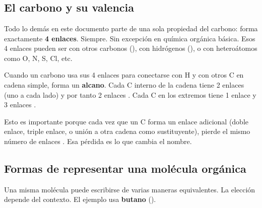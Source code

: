 \setlength{\tabcolsep}{4pt}
\renewcommand{\arraystretch}{1.3}
\setlength{\parindent}{0pt}
\setlength{\LTleft}{0pt}
\setlength{\LTright}{0pt}


{}
\section*{\centering\fontsize{12}{18}}

{}
\subsection*{\textcolor{blueunam}{El carbono y su valencia}}

Todo lo demás en este documento parte de una sola propiedad del carbono: forma exactamente
\textbf{4 enlaces}. Siempre. Sin excepción en química orgánica básica. Esos 4 enlaces pueden
ser con otros carbonos (), con hidrógenos (), o con heteroátomos como O, N,
S, Cl, etc.

Cuando un carbono usa sus 4 enlaces para conectarse con H y con otros C en cadena simple,
forma un \textbf{alcano}. Cada C interno de la cadena tiene 2 enlaces  (uno a cada
lado) y por tanto 2 enlaces . Cada C en los extremos tiene 1 enlace  y 3
enlaces .

Esto es importante porque cada vez que un C forma un enlace  adicional (doble enlace,
triple enlace, o unión a otra cadena como sustituyente), pierde el mismo número de enlaces
. Esa pérdida es lo que cambia el nombre.

{}
\subsection*{\textcolor{blueunam}{Formas de representar una molécula orgánica}}

Una misma molécula puede escribirse de varias maneras equivalentes. La elección depende del
contexto. El ejemplo usa \textbf{butano} ().

